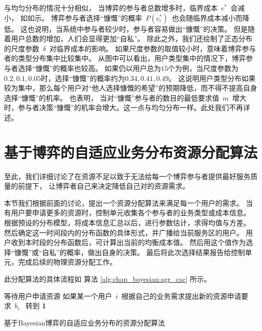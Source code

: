 与均匀分布的情况十分相似，
当博弈的参与者总数增多时，临界成本~$c^*$~会减小， 如如示。
博弈参与者选择“慷慨”的概率~$P(c_i^*)$~也会随临界成本减小而降低。
这也说明，当系统中参与者较少时，参与者容易做出“慷慨”的决策。
但是随着用户总数的增加，人们会显得更加“自私”。
除此之外，我们还绘制了正态分布的尺度参数~$\delta$~对临界成本的影响。
如果尺度参数的取值较小时，意味着博弈参与者的类型分布集中比较集中。
从图中可以看出，用户类型集中的情况下，博弈参与者选择“慷慨”的概率也较高。
如果仍以用户总为$15$个为例，当尺度参数为$0.2, 0.1, 0.05$时，选择“慷慨”的概率约为$0.34, 0.41, 0.49$。
这说明用户类型分布如果较为集中，那么每个用户对“他人选择慷慨的希望”的预期降低，而不得不提高自身选择“慷慨”的机率。
也表明，
当对“慷慨”参与者的数目的最低要求值~$m$~增大时，参与者决策“慷慨”的机率会增大。这一点与均匀分布一样。此处我们不再详述。


\section{基于博弈的自适应业务分布资源分配算法}
至此，我们详细讨论了在资源不足以致于无法给每一个博弈参与者提供最好服务质量的前提下，
让博弈者自己来决定降低自己对的资源需求。

本节我们根据前面的讨论，提出一个资源分配算法来满足每一个用户的需求。
当有用户要申请更多的资源时，控制单元收集各个参与者的业务类型或成本信息。
根据预设的分布模型，将成本信息汇总以后，进行参数估计，求得均值与方差。
然后确定这一时间段内的分布函数的具体形式，并广播给当前服务区的用户。
用户收到本时段的分布函数后，可计算出当前的均衡成本值。
然后用这个值作为选择“慷慨”或“自私”的概率，做出自身的决策。
最后将此次选择结果报告给控制单元，完成后续的物理资源分配工作。

此分配算法的具体流程如 算法 \ref{alg:chap_bayesian:agr_cac} 所示。
\begin{algorithm}[!htbp]
\SetAlgoLined
等待用户申请资源 \;
如果某一个用户~$i$~根据自己的业务需求提出新的资源申请要求~$b_i$~ \;
    转到 \bf 1\;
\caption{基于Bayesian博弈的自适应业务分布的资源分配算法} 
\label{alg:chap_bayesian:agr_cac}
\end{algorithm}

